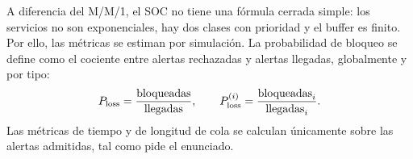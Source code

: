 A diferencia del M/M/1, el SOC no tiene una fórmula cerrada simple: los
servicios no son exponenciales, hay dos clases con prioridad y el buffer es
finito. Por ello, las métricas se estiman por simulación. La probabilidad de
bloqueo se define como el cociente entre alertas rechazadas y alertas
llegadas, globalmente y por tipo:
\begin{equation}
P_{\text{loss}}=\frac{\text{bloqueadas}}{\text{llegadas}},\qquad
P_{\text{loss}}^{(i)}=\frac{\text{bloqueadas}_i}{\text{llegadas}_i}.
\end{equation}
Las métricas de tiempo y de longitud de cola se calculan únicamente sobre las
alertas admitidas, tal como pide el enunciado.
